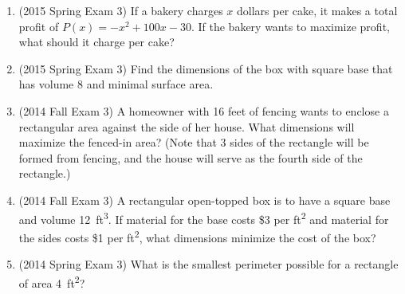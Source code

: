 \documentclass[10pt]{scrartcl}
\begin{document}
\begin{enumerate}
\item (2015 Spring Exam 3) If a bakery charges $x$ dollars per cake, it makes a total profit of $P(x) = -x^2 + 100 x - 30$. If the bakery wants to maximize profit, what should it charge per cake?
\item (2015 Spring Exam 3) Find the dimensions of the box with square base that has volume 8 and minimal surface area.
\item (2014 Fall Exam 3) A homeowner with 16 feet of fencing wants to enclose a rectangular area against the side of her house. What dimensions will maximize the fenced-in area? (Note that 3 sides of the rectangle will be formed from fencing, and the house will serve as the fourth side of the rectangle.)
\item (2014 Fall Exam 3) A rectangular open-topped box is to have a square base and volume \SI{12}{ft^3}. If material for the base costs \$3 per \si{ft^2} and material for the sides costs \$1 per \si{ft^2}, what dimensions minimize the cost of the box?
\item (2014 Spring Exam 3) What is the smallest perimeter possible for a rectangle of area \SI{4}{ft^2}?
\end{enumerate}
\end{document}
